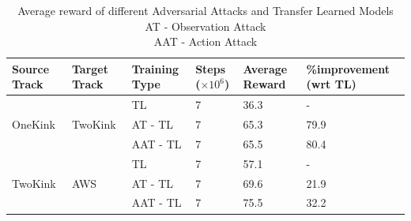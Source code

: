 \begin{table}[H]
\begin{tabular}{|p{1.8cm}|p{1.8cm}|l|p{1.8cm}|l|p{3.2cm}|}
\hline
\textbf{Source Track} & \textbf{Target Track} & \textbf{Training Type} & \textbf{Steps ($\times 10^{6}$)} & \textbf{Average Reward} & \textbf{\%improvement (wrt TL)} \\ \hline
\multirow{3}{*}{OneKink}               & \multirow{3}{*}{TwoKink}               & TL                                      & 7                                             & 36.3                                     & -                      \\ \cline{3-6} 
                                      &                                        & AT - TL                                 & 7                                             & 65.3                                     & 79.9                   \\ \cline{3-6} 
                                      &                                        & AAT - TL                                & 7                                             & 65.5                                     & 80.4                   \\ \hline
\multirow{3}{*}{TwoKink}               & \multirow{3}{*}{AWS}                   & TL                                      & 7                                             & 57.1                                     & -                      \\ \cline{3-6} 
                                      &                                        & AT - TL                                 & 7                                             & 69.6                                     & 21.9                   \\ \cline{3-6} 
                                      &                                        & AAT - TL                                & 7                                             & 75.5                                     & 32.2                   \\ \hline
\end{tabular}
\caption{Average reward  of different Adversarial Attacks and Transfer Learned Models \\ AT - Observation Attack \\ AAT - Action Attack}
\label{tab:phase2}
\end{table}


